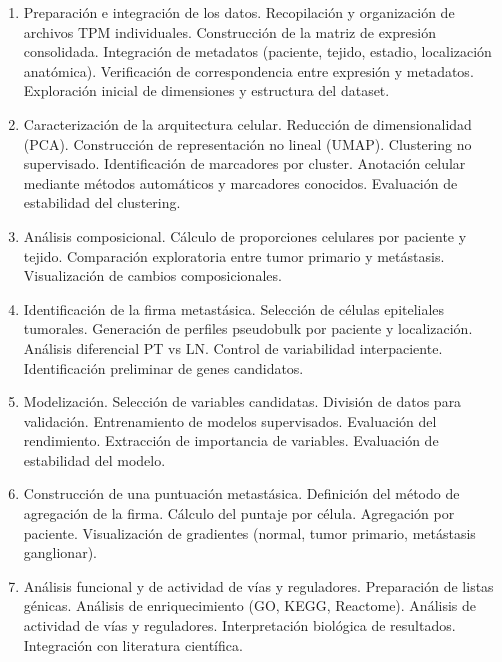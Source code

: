 \documentclass[11pt]{article}
\begin{document}
		\begin{enumerate}
			\item Preparación e integración de los datos.
				\subitem Recopilación y organización de archivos TPM individuales.
				\subitem Construcción de la matriz de expresión consolidada.
				\subitem Integración de metadatos (paciente, tejido, estadio, localización anatómica).
				\subitem Verificación de correspondencia entre expresión y metadatos.
				\subitem Exploración inicial de dimensiones y estructura del dataset.
				
			\item Caracterización de la arquitectura celular.
				\subitem Reducción de dimensionalidad (PCA).
				\subitem Construcción de representación no lineal (UMAP).
				\subitem Clustering no supervisado.
				\subitem Identificación de marcadores por cluster.
				\subitem Anotación celular mediante métodos automáticos y marcadores conocidos.
				\subitem Evaluación de estabilidad del clustering.
				
			\item Análisis composicional.
				\subitem Cálculo de proporciones celulares por paciente y tejido.
				\subitem Comparación exploratoria entre tumor primario y metástasis.
				\subitem Visualización de cambios composicionales.
				
			\item Identificación de la firma metastásica.
				\subitem Selección de células epiteliales tumorales.
				\subitem Generación de perfiles pseudobulk por paciente y localización.
				\subitem Análisis diferencial PT vs LN.
				\subitem Control de variabilidad interpaciente.
				\subitem Identificación preliminar de genes candidatos.
				
			\item Modelización.
				\subitem Selección de variables candidatas.
				\subitem División de datos para validación.
				\subitem Entrenamiento de modelos supervisados.
				\subitem Evaluación del rendimiento.
				\subitem Extracción de importancia de variables.
				\subitem Evaluación de estabilidad del modelo.
				
				
			\item Construcción de una puntuación metastásica.
				\subitem Definición del método de agregación de la firma.
				\subitem Cálculo del puntaje por célula.
				\subitem Agregación por paciente.
				\subitem Visualización de gradientes (normal, tumor primario, metástasis ganglionar).
				
				
			\item Análisis funcional y de actividad de vías y reguladores.
				\subitem Preparación de listas génicas.
				\subitem Análisis de enriquecimiento (GO, KEGG, Reactome).
				\subitem Análisis de actividad de vías y reguladores.
				\subitem Interpretación biológica de resultados.
				\subitem Integración con literatura científica.
				

\end{enumerate}
\end{document}
